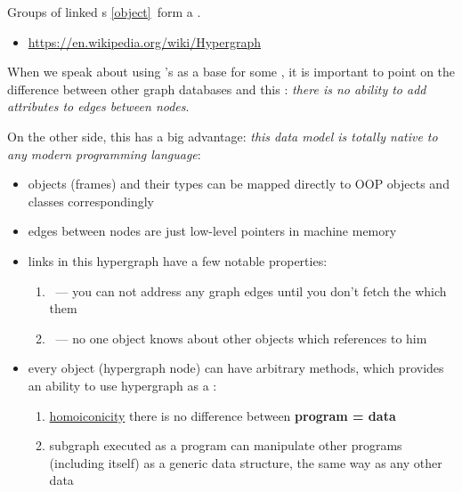 \clearpage
{}\label{og}

Groups of linked s \ref{object}\ form a .

\begin{itemize}
    \item \url{https://en.wikipedia.org/wiki/Hypergraph}
\end{itemize}

When we speak about using \mel's  as a base for some
, it is important to point on the difference between
other graph databases and this : \emph{there is no
ability to add attributes to edges between nodes}.

On the other side, this  has a big advantage: \emph{this
data model is totally native to any modern programming language}:
\begin{itemize}

    \item objects (frames) and their types can be mapped directly to OOP objects
    and classes correspondingly

    \item edges between nodes are just low-level pointers in machine memory

    \item links in this hypergraph have a few notable properties:
    \begin{enumerate}
        \item {}\ --- you can not address any graph
        edges until you don't fetch the  which 
        them
        \item {}\ --- no one object knows about other objects
        which references to him
    \end{enumerate}

    \item every object (hypergraph node) can have arbitrary methods, which
    provides an ability to use hypergraph as a :
    \begin{enumerate}
        \item \href{https://en.wikipedia.org/wiki/Homoiconicity}{homoiconicity}
        there is no difference between \textbf{program = data}
        \item subgraph executed as a program can manipulate other programs
        (including itself) as a generic data structure, the same way as any
        other data
    \end{enumerate}

\end{itemize}
